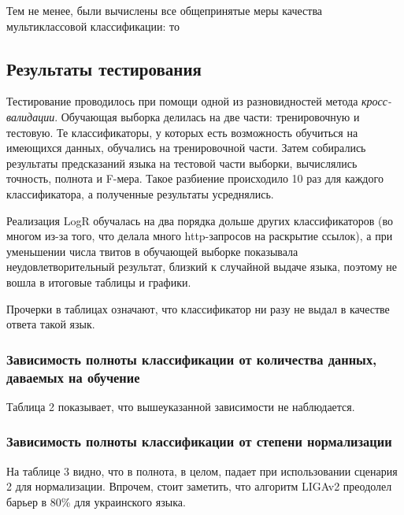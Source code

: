 \documentclass[a4paper, 14pt]{article}
\begin{document}
		Тем не менее, были вычислены все общепринятые меры качества мультиклассовой классификации: то
       
\subsection{Результаты тестирования}
		Тестирование проводилось при помощи одной из разновидностей метода \textit{кросс-валидации}. 
		Обучающая выборка делилась на две части: тренировочную и тестовую. Те классификаторы, у которых есть
		возможность обучиться на имеющихся данных, обучались на тренировочной части. Затем собирались результаты
		предсказаний языка на тестовой части выборки, вычислялись точность, полнота и F-мера. Такое разбиение
		происходило 10 раз для каждого классификатора, а полученные результаты усреднялись.
		
		Реализация LogR обучалась на два порядка дольше других классификаторов (во многом из-за того, что делала много http-запросов
		на раскрытие ссылок), а при уменьшении числа твитов в обучающей выборке показывала неудовлетворительный результат, близкий к случайной
		выдаче языка, поэтому не вошла в итоговые таблицы и графики.
		
		Прочерки в таблицах означают, что классификатор ни разу не выдал в качестве ответа такой язык.
		
		\subsubsection{Зависимость полноты классификации от количества данных, даваемых на обучение}
		Таблица 2 показывает, что вышеуказанной зависимости не наблюдается.
		
		\subsubsection{Зависимость полноты классификации от степени нормализации}
		На таблице 3 видно, что в полнота, в целом, падает при использовании сценария 2 для нормализации. Впрочем, 
		стоит заметить, что алгоритм LIGAv2 преодолел барьер в 80\% для украинского языка.
\end{document}
